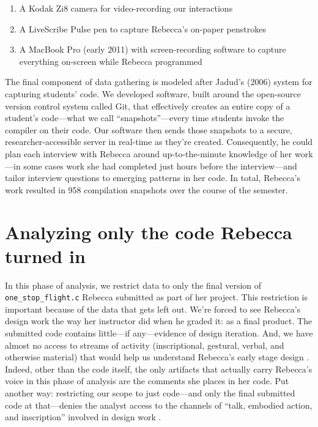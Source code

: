 \begin{enumerate}
\def\labelenumi{\arabic{enumi}.}
\tightlist
\item
  A Kodak Zi8 camera for video-recording our interactions
\item
  A LiveScribe Pulse pen to capture Rebecca's on-paper penstrokes
\item
  A MacBook Pro (early 2011) with screen-recording software to capture
  everything on-screen while Rebecca programmed
\end{enumerate}

The final component of data gathering is modeled after Jadud's (2006)
system for capturing students' code. We developed
software, built around the open-source version control system called
Git, that effectively creates an entire copy of a student's code---what
we call ``snapshots''---every time students invoke the compiler on their
code. Our software then sends those snapshots to a secure,
researcher-accessible server in real-time as they're created.
Consequently, he could plan each interview with Rebecca around
up-to-the-minute knowledge of her work---in some cases work she had
completed just hours before the interview---and tailor interview
questions to emerging patterns in her code. In total, Rebecca's work
resulted in 958 compilation snapshots over the course of the semester.

\section{Analyzing only the code Rebecca turned in}\label{analyzing-only-the-code-rebecca-turned-in-what-an-instructor-might-see}

In this phase of analysis, we restrict data to only the final version of \texttt{one\_stop\_flight.c} Rebecca submitted as part of her project. This restriction is important because of the data that gets left out. We're forced to see Rebecca's design work the way her instructor did when he graded it: as a final product. The submitted code contains little---if any---evidence of design iteration. And, we have almost no access to streams of activity (inscriptional, gestural, verbal, and otherwise material) that would help us understand Rebecca's early stage design \citep{petre_software_2014}. Indeed, other than the code itself, the only artifacts that actually carry Rebecca's voice in this phase of analysis are the comments she places in her code. Put another way: restricting our scope to just code---and only the final submitted code at that---denies the analyst access to the channels of ``talk, embodied action, and inscription'' involved in design work \citep[ p.~179]{hall_disrupting_2002}.

